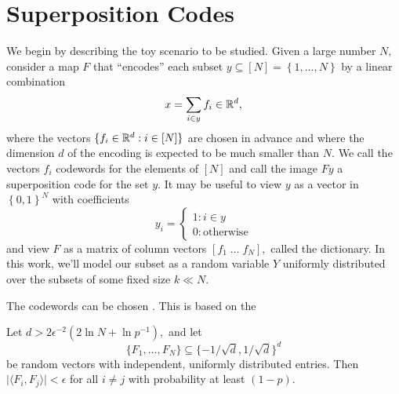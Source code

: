 \section{Superposition Codes \label{sec:codes}}

We begin by describing the toy scenario to be studied. Given a large number $N,$ consider a map $F$ that ``encodes'' each subset $y \subseteq [N] = \left\{ 1, \dots, N \right\}$ by a linear combination
$$
	x = \sum_{i \in y} f_i \in \mathbb{R}^d,
$$
where the vectors $\{ f_i \in \mathbb{R}^d : i \in [N] \}$ are chosen in advance and where the dimension $d$ of the encoding is expected to be much smaller than $N.$ We call the vectors $f_i$ codewords for the elements of $[N]$ and call the image $Fy$ a superposition code for the set $y.$ It may be useful to view $y$ as a vector in $\left\{ 0, 1 \right\}^N$ with coefficients
$$
	y_i = \begin{cases}
		1: i \in y \\
		0 : \text{otherwise}
	\end{cases}
$$
and view $F$ as a matrix of column vectors $[f_1 \; \dots \; f_N],$ called the dictionary. In this work, we'll model our subset as a random variable $Y$ uniformly distributed over the subsets of some fixed size $k \ll N.$

The codewords can be chosen . This is based on the

\begin{proposition}
	\label{prop:many-ortho}
	Let $d > 2 \epsilon^{-2} (2 \ln N + \ln p^{-1}),$ and let
	$$
		\{ F_1, \dots, F_N \} \subseteq \{ - 1/\sqrt d,  1 / \sqrt d \}^d
	$$
	be random vectors with independent, uniformly distributed entries. Then $\lvert \langle F_i, F_j \rangle \rvert < \epsilon$ for all $i \neq j$ with probability at least $(1 - p).$
\end{proposition}

